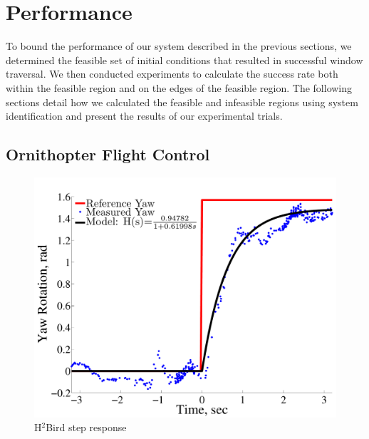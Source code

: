 \documentclass{aamas2013}
\begin{document}

\section{Performance}
\label{sec:performance}
To bound the performance of our system described in the previous sections, we
determined the feasible set of initial conditions that resulted in successful
window traversal. We then conducted experiments to calculate the success rate
both within the feasible region and on the edges of the feasible region. The
following sections detail how we calculated the feasible and infeasible
regions using system identification and present the results of our
experimental trials.

\subsection{Ornithopter Flight Control}
\label{sec:flight_control}
\begin{figure}[tb]
\centering
\includegraphics[width=\linewidth]{figures/step_response_total.pdf}
\caption{H$^2$Bird step response}
\label{fig:step_response}
\end{figure}
\end{document}
